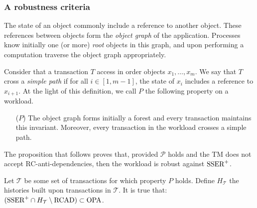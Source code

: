 \subsubsection{A robustness criteria}

The state of an object commonly include a reference to another object.
These references between objects form the \emph{object graph} of the application.
Processes know initially one (or more) \emph{root} objects in this graph, and upon performing a computation traverse the object graph appropriately.

Consider that a transaction $T$ access in order objects $x_1, \ldots, x_m$.
We say that $T$ cross a \emph{simple path} if for all $i \in [1,m-1]$, the state of $x_i$ includes a reference to $x_{i+1}$.
At the light of this definition, we call $P$ the following property on a workload.

\begin{itemize}
\item[($P$)]
  The object graph forms initially a forest and every transaction maintains this invariant.
  Moreover, every transaction in the workload crosses a simple path.
\end{itemize}

The proposition that follows proves that, provided $\mathcal{P}$ holds and the TM does not accept RC-anti-dependencies, then the workload is robust against $\SPSER$.

\begin{proposition}
  Let $\mathcal{T}$ be some set of transactions for which property $P$ holds.
  Define $H_{\mathcal{T}}$ the histories built upon transactions in $\mathcal{T}$.
  It is true that: $(\SPSER \inter H_{\mathcal{T}} \setminus \RCAD) \subset \OPA$.
\end{proposition}

